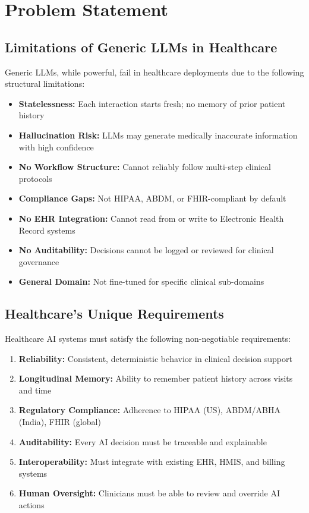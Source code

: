 \documentclass[12pt,a4paper]{article}
\begin{document}
\newpage

\section{Problem Statement}

\subsection{Limitations of Generic LLMs in Healthcare}

Generic LLMs, while powerful, fail in healthcare deployments due to the following structural limitations:

\begin{itemize}[noitemsep]
    \item \textbf{Statelessness:} Each interaction starts fresh; no memory of prior patient history
    \item \textbf{Hallucination Risk:} LLMs may generate medically inaccurate information with high confidence
    \item \textbf{No Workflow Structure:} Cannot reliably follow multi-step clinical protocols
    \item \textbf{Compliance Gaps:} Not HIPAA, ABDM, or FHIR-compliant by default
    \item \textbf{No EHR Integration:} Cannot read from or write to Electronic Health Record systems
    \item \textbf{No Auditability:} Decisions cannot be logged or reviewed for clinical governance
    \item \textbf{General Domain:} Not fine-tuned for specific clinical sub-domains
\end{itemize}

\subsection{Healthcare's Unique Requirements}

Healthcare AI systems must satisfy the following non-negotiable requirements:

\begin{enumerate}
    \item \textbf{Reliability:} Consistent, deterministic behavior in clinical decision support
    \item \textbf{Longitudinal Memory:} Ability to remember patient history across visits and time
    \item \textbf{Regulatory Compliance:} Adherence to HIPAA (US), ABDM/ABHA (India), FHIR (global)
    \item \textbf{Auditability:} Every AI decision must be traceable and explainable
    \item \textbf{Interoperability:} Must integrate with existing EHR, HMIS, and billing systems
    \item \textbf{Human Oversight:} Clinicians must be able to review and override AI actions
\end{enumerate}
\end{document}
